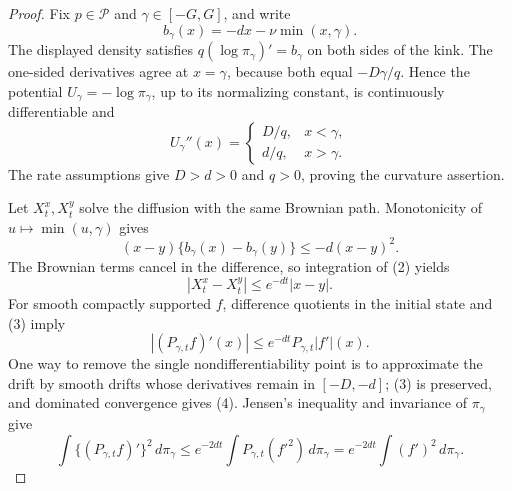 \documentclass{article}
\begin{document}
\begin{proof}
Fix \(p\in\mathcal P\) and \(\gamma\in[-G,G]\), and write
\[
 b_\gamma(x)=-dx-\nu\min(x,\gamma).
\]
The displayed density satisfies \(q(\log\pi_\gamma)'=b_\gamma\) on both sides of the kink.  The one-sided derivatives agree at \(x=\gamma\), because both equal \(-D\gamma/q\).  Hence the potential \(U_\gamma=-\log\pi_\gamma\), up to its normalizing constant, is continuously differentiable and
\[
 U_\gamma''(x)=
 \begin{cases}
 D/q,&x<\gamma,\\
 d/q,&x>\gamma.
 \end{cases}                                                   \tag{1}
\]
The rate assumptions give \(D>d>0\) and \(q>0\), proving the curvature assertion.

Let \(X_t^x,X_t^y\) solve the diffusion with the same Brownian path.  Monotonicity of \(u\mapsto\min(u,\gamma)\) gives
\[
 (x-y)\{b_\gamma(x)-b_\gamma(y)\}\leq-d(x-y)^2.              \tag{2}
\]
The Brownian terms cancel in the difference, so integration of (2) yields
\[
 |X_t^x-X_t^y|\leq e^{-dt}|x-y|.                              \tag{3}
\]
For smooth compactly supported \(f\), difference quotients in the initial state and (3) imply
\[
 |(P_{\gamma,t}f)'(x)|
 \leq e^{-dt}P_{\gamma,t}|f'|(x).                             \tag{4}
\]
One way to remove the single nondifferentiability point is to approximate the drift by smooth drifts whose derivatives remain in \([-D,-d]\); (3) is preserved, and dominated convergence gives (4).  Jensen's inequality and invariance of \(\pi_\gamma\) give
\[
 \int\{(P_{\gamma,t}f)'\}^2\,d\pi_\gamma
 \leq e^{-2dt}\int P_{\gamma,t}(f'^2)\,d\pi_\gamma
 =e^{-2dt}\int(f')^2\,d\pi_\gamma.                           \tag{5}
\]


\end{proof}
\end{document}
